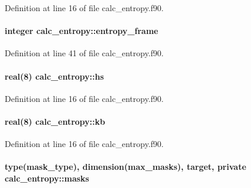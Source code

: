 Definition at line 16 of file calc\-\_\-entropy.\-f90.

\hypertarget{classcalc__entropy_a530d9ffe62a5dde36d2b21a72da0be95}{
\paragraph[{entropy\-\_\-frame}]{\setlength{\rightskip}{0pt plus 5cm}integer calc\-\_\-entropy\-::entropy\-\_\-frame}}\label{classcalc__entropy_a530d9ffe62a5dde36d2b21a72da0be95}


Definition at line 41 of file calc\-\_\-entropy.\-f90.

\hypertarget{classcalc__entropy_a365c453093f33984755407e59cd2b03f}{
\paragraph[{hs}]{\setlength{\rightskip}{0pt plus 5cm}real(8) calc\-\_\-entropy\-::hs}}\label{classcalc__entropy_a365c453093f33984755407e59cd2b03f}


Definition at line 16 of file calc\-\_\-entropy.\-f90.

\hypertarget{classcalc__entropy_a535551365a6e86ba63b99605509d12d8}{
\paragraph[{kb}]{\setlength{\rightskip}{0pt plus 5cm}real(8) calc\-\_\-entropy\-::kb}}\label{classcalc__entropy_a535551365a6e86ba63b99605509d12d8}


Definition at line 16 of file calc\-\_\-entropy.\-f90.

\hypertarget{classcalc__entropy_aec8b2f5549506f769e3281da73e1e70d}{
\paragraph[{masks}]{\setlength{\rightskip}{0pt plus 5cm}type(mask\-\_\-type), dimension(max\-\_\-masks), target, private calc\-\_\-entropy\-::masks\hspace{0.3cm}{\ttfamily [private]}}}\label{classcalc__entropy_aec8b2f5549506f769e3281da73e1e70d}


